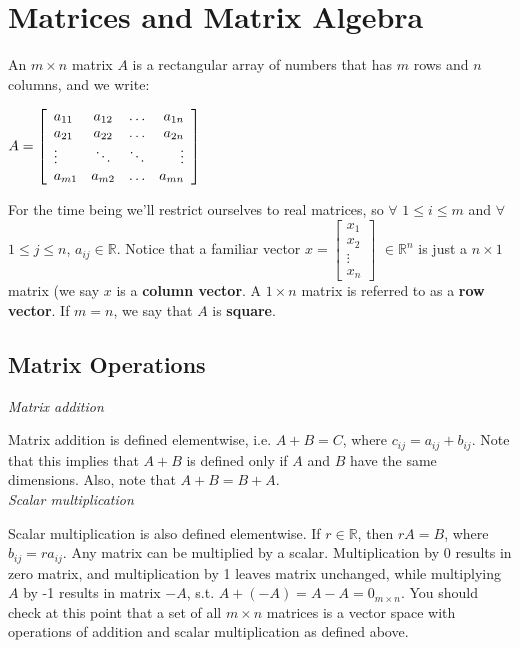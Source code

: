 \documentclass[12pt,oneside]{article}
\begin{document}
\section{Matrices and Matrix Algebra}
An $m \times n$ matrix $A$ is a rectangular array of numbers that has $m$
rows and $n$ columns, and we write:
\begin{center}
$A = \left[ \begin{array} {l c c r} a_{11} & a_{12} & \ldots & a_{1n}  \\
    a_{21} & a_{22} & \ldots & a_{2n} \\ \vdots & \ddots & \ddots & \vdots
    \\ a_{m1} & a_{m2} & \ldots & a_{mn} \end{array} \right]$
\end{center}
For the time being we'll restrict ourselves to real matrices, so
$\forall$ $1 \leq i \leq m$ and $\forall$ $1 \leq j \leq n$, $a_{ij}
\in \mathbb{R}$. Notice that a familiar vector $x = \left[
  \begin{array} {c} x_1 \\ x_2 \\ \vdots \\ x_n \end{array} \right]$
$\in {\mathbb{R}}^n$ is just a $n \times 1$ matrix (we say $x$ is a
\textbf{column vector}. A $1 \times n$ matrix is referred to as a
\textbf{row vector}. If $m = n$, we say that $A$ is
\textbf{square}.

\subsection{Matrix Operations}

\noindent \emph{Matrix addition}

Matrix addition is defined elementwise, i.e. $A + B = C$, where
$c_{ij} = a_{ij} + b_{ij}$. Note that this implies that $A + B$ is
defined only if $A$ and $B$ have the same dimensions. Also, note that
$A + B = B + A$. \\

\noindent \emph{Scalar multiplication}

Scalar multiplication is also defined elementwise. If $r \in
\mathbb{R}$, then $r A = B$, where $b_{ij} = r a_{ij}$. Any matrix can
be multiplied by a scalar. Multiplication by 0 results in zero matrix,
and multiplication by 1 leaves matrix unchanged, while multiplying $A$
by -1 results in matrix $-A$, s.t. $A + (-A) = A - A = 0_{m \times
  n}$. You should check at this point that a set of all $m \times n$
matrices is a vector space with operations of addition and scalar
multiplication as defined above.\\
\end{document}
